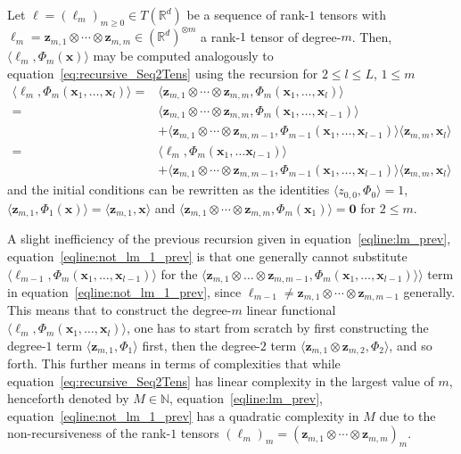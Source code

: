\documentclass{article} \usepackage{iclr2021_conference,times}
\def\eqref#1{equation~\ref{#1}}
\newcommand{\R}{\mathbb{R}}
\newcommand{\bx}{\mathbf{x}}
\newcommand{\bz}{\mathbf{z}}
\newcommand{\NN}{\mathbb{N}}
\theoremstyle{plain}
\theoremstyle{definition}
\begin{document}
Let $\ell = (\ell_m)_{m \geq 0} \in T(\R^d)$ be a sequence of rank-$1$ tensors with $\ell_m = \bz_{m,1} \otimes \cdots \otimes \bz_{m,m} \in (\R^d)^{\otimes m}$ a rank-$1$ tensor of degree-$m$. Then, $\langle \ell_m, \Phi_m(\bx) \rangle$ may be computed analogously to \eqref{eq:recursive_Seq2Tens} using the recursion for $2 \leq l \leq L$, $1 \leq m$
\begin{align} \label{eq:ls2t_independent}
    \langle \ell_m, \Phi_m(\bx_1, \dots, \bx_l) \rangle =& \langle \bz_{m, 1} \otimes \cdots \otimes \bz_{m, m}, \Phi_m(\bx_1, \dots, \bx_l) \rangle \\ =& \langle \bz_{m, 1} \otimes \cdots \otimes \bz_{m, m}, \Phi_m(\bx_1, \dots, \bx_{l-1}) \rangle \\
    &+ \langle \bz_{m, 1} \otimes \cdots \otimes \bz_{m, m-1}, \Phi_{m-1}(\bx_1, \dots, \bx_{l-1}) \rangle \langle \mathbf{z}_{m,m}, \bx_{l} \rangle \\
    =& \langle \ell_m, \Phi_m(\bx_1, \dots \bx_{l-1}) \rangle \label{eqline:lm_prev} \\
    &+ \langle \bz_{m, 1} \otimes \cdots \otimes \bz_{m, m-1}, \Phi_{m-1}(\bx_1, \dots, \bx_{l-1}) \rangle \langle \mathbf{z}_{m,m}, \bx_{l} \label{eqline:not_lm_1_prev} \rangle
\end{align}
and the initial conditions can be rewritten as the identities $\langle z_{0, 0}, \Phi_0 \rangle = 1$, $\langle \mathbf{z}_{m,1}, \Phi_1(\bx) \rangle = \langle \mathbf{z}_{m,1}, \bx \rangle$ and $\langle \bz_{m,1} \otimes \cdots \otimes \bz_{m, m}, \Phi_m(\bx_1) \rangle = \mathbf{0}$ for $2 \leq m$.

A slight inefficiency of the previous recursion given in \eqref{eqline:lm_prev}, \eqref{eqline:not_lm_1_prev} is that one generally cannot substitute $\langle \ell_{m-1}, \Phi_m(\bx_1, \dots, \bx_{l-1}) \rangle$ for the $\langle \bz_{m,1} \otimes \dots \otimes \bz_{m, m-1}, \Phi_m(\bx_1, \dots, \bx_{l-1}) \rangle \rangle$ term in \eqref{eqline:not_lm_1_prev}, since $\ell_{m-1} \neq \bz_{m,1} \otimes \cdots \otimes \bz_{m, m-1}$ generally. This means that to construct the degree-$m$ linear functional $\langle \ell_m, \Phi_m(\bx_1, \dots, \bx_l) \rangle$, one has to start from scratch by first constructing the degree-$1$ term $\langle \bz_{m,1}, \Phi_1 \rangle$ first, then the degree-$2$ term $\langle \bz_{m,1} \otimes \bz_{m,2}, \Phi_2 \rangle$, and so forth. This further means in terms of complexities that while \eqref{eq:recursive_Seq2Tens} has linear complexity in the largest value of $m$, henceforth denoted by $M \in \NN$, \eqref{eqline:lm_prev}, \eqref{eqline:not_lm_1_prev} has a quadratic complexity in $M$ due to the non-recursiveness of the rank-$1$ tensors $(\ell_m)_{m} = (\bz_{m,1} \otimes \cdots \otimes \bz_{m,m})_m$.
\end{document}
